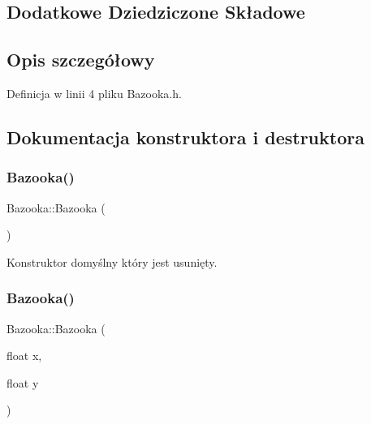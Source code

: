 \subsection*{Dodatkowe Dziedziczone Składowe}


\subsection{Opis szczegółowy}


Definicja w linii 4 pliku Bazooka.\+h.



\subsection{Dokumentacja konstruktora i destruktora}
\mbox{\label{class_bazooka_ab95ef6e55a5d1a7748df7287b562002b}} 
\subsubsection{\texorpdfstring{Bazooka()}{Bazooka()}\hspace{0.1cm}{\footnotesize\ttfamily [1/2]}}
{\footnotesize\ttfamily Bazooka\+::\+Bazooka (\begin{DoxyParamCaption}{ }\end{DoxyParamCaption})\hspace{0.3cm}{\ttfamily [delete]}}



Konstruktor domyślny który jest usunięty. 

\mbox{\label{class_bazooka_aa3a6371f52b0649a6789401b8a11e8bd}} 
\subsubsection{\texorpdfstring{Bazooka()}{Bazooka()}\hspace{0.1cm}{\footnotesize\ttfamily [2/2]}}
{\footnotesize\ttfamily Bazooka\+::\+Bazooka (\begin{DoxyParamCaption}\item[{float}]{x,  }\item[{float}]{y }\end{DoxyParamCaption})}



